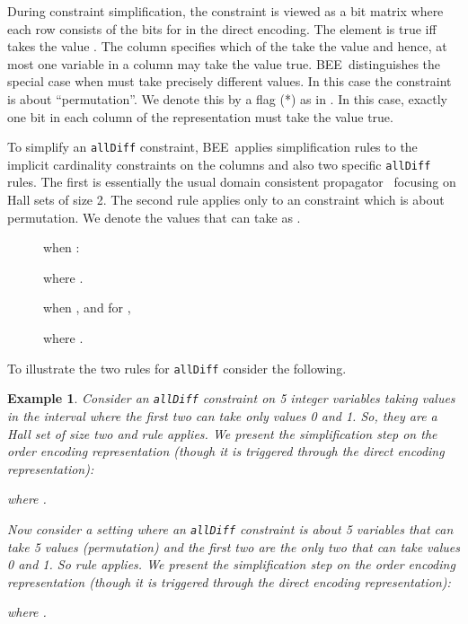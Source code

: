 \documentclass{tlp}
\newtheorem{example}[theorem]{Example}
\newcommand{\bee}{\textsf{BEE}}
\begin{document}
During constraint simplification, the
 constraint is viewed as a bit
matrix where each row consists of the bits
 for  in the direct
encoding. The element  is true iff  takes the value .
The  column specifies which of the  take the value 
and hence, at most one variable in a column may take the value true.
\bee\ distinguishes the special case when 
must take precisely  different values. In this case the constraint
is about ``permutation''. We denote this by a flag (*) as in
. In this case, exactly one bit
in each column of the representation must take the value true.

To simplify an \texttt{allDiff} constraint, \bee\ applies
simplification rules to the implicit cardinality constraints on the
columns and also two specific \texttt{allDiff} rules. The first is
essentially the usual domain consistent propagator~\cite{regin}
focusing on Hall sets of size 2. The second rule applies only to an
 constraint which is about permutation.
We denote the values that  can take as
.

\begin{description}
\item[]  
 when :

  where .


\item[]  when
  ,
   and for ,
   

  where .


\end{description}

To illustrate the two rules for \texttt{allDiff} consider the
following.  
\begin{example}
  Consider an \texttt{allDiff} constraint on 5 integer variables
  taking values in the interval  where the first two can take
  only values 0 and 1. So, they are a Hall set of size two and rule
   applies. We present the simplification step on
  the order encoding representation (though it is triggered through
  the direct encoding representation): \vspace{-2mm}

where .

Now consider a setting where an \texttt{allDiff} constraint is about 5
variables that can take 5 values (permutation) and the first two are
the only two that can take values 0 and 1. So rule
 applies. We present the simplification step on
  the order encoding representation (though it is triggered through
  the direct encoding representation):
\vspace{-2mm}

  where .


\end{example}
\end{document}
